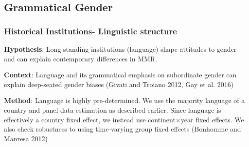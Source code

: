 \documentclass[9pt,letterpaper,subeqn]{beamer}
\begin{document}

\subsection{Grammatical Gender}
\begin{frame}
\frametitle{Historical Institutions- Linguistic structure}
\textbf{Hypothesis}: Long-standing institutions (language) shape attitudes to gender and can explain contemporary differences in MMR. \\
\vspace{3mm}


\textbf{Context}: Language and its grammatical emphasis on subordinate gender can
explain deep-seated gender biases
(Givati and Troiano 2012, Gay et al. 2016)\\
\vspace{3mm}

\textbf{Method}: Language is highly pre-determined. We use the majority language of a country and panel data estimation as described earlier. 
Since language is effectively a country fixed effect, we instead use continent$\times$year fixed effects. 
We also check robustness to using time-varying group fixed effects (Bonhomme and Manresa 2012)
\end{frame}
\end{document}
